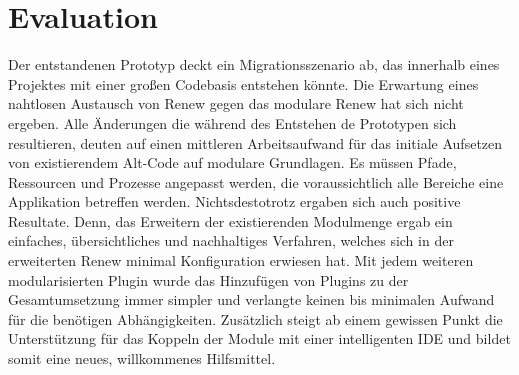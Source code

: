 \section{Evaluation}
	Der entstandenen Prototyp deckt ein Migrationsszenario ab, das innerhalb eines Projektes mit einer großen Codebasis entstehen könnte. Die Erwartung eines nahtlosen Austausch von Renew gegen das modulare Renew hat sich nicht ergeben. Alle Änderungen die während des Entstehen de Prototypen sich resultieren, deuten auf einen mittleren Arbeitsaufwand für das initiale Aufsetzen von existierendem Alt-Code auf modulare Grundlagen. Es müssen Pfade, Ressourcen und Prozesse angepasst werden, die voraussichtlich alle Bereiche eine Applikation betreffen werden.\newline
	Nichtsdestotrotz ergaben sich auch positive Resultate. Denn, das Erweitern der existierenden Modulmenge ergab ein einfaches, übersichtliches und nachhaltiges Verfahren, welches sich in der erweiterten Renew minimal Konfiguration erwiesen hat. Mit jedem weiteren modularisierten Plugin wurde das Hinzufügen von Plugins zu der Gesamtumsetzung immer simpler und verlangte keinen bis minimalen Aufwand für die benötigen Abhängigkeiten. Zusätzlich steigt ab einem gewissen Punkt die Unterstützung für das Koppeln der Module mit einer intelligenten IDE und bildet somit eine neues, willkommenes Hilfsmittel.

